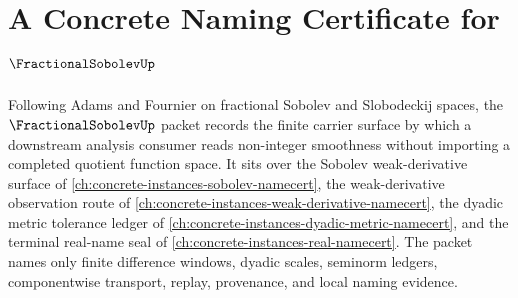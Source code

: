 \chapter{A Concrete Naming Certificate for $\FractionalSobolevUp$}
\label{ch:concrete-instances-fractional-sobolev-namecert}

Following Adams and Fournier on fractional Sobolev and Slobodeckij spaces, the $\FractionalSobolevUp$ packet records the finite carrier surface by which a downstream analysis consumer reads non-integer smoothness without importing a completed quotient function space. It sits over the Sobolev weak-derivative surface of \autoref{ch:concrete-instances-sobolev-namecert}, the weak-derivative observation route of \autoref{ch:concrete-instances-weak-derivative-namecert}, the dyadic metric tolerance ledger of \autoref{ch:concrete-instances-dyadic-metric-namecert}, and the terminal real-name seal of \autoref{ch:concrete-instances-real-namecert}. The packet names only finite difference windows, dyadic scales, seminorm ledgers, componentwise transport, replay, provenance, and local naming evidence.

